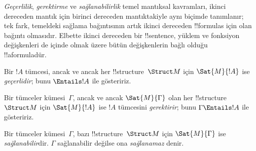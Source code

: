 


\begin{explain}
\emph{Geçerlilik}, \emph{gerektirme} ve \emph{sağlanabilirlik} temel
mantıksal kavramları, ikinci dereceden mantık için birinci dereceden
mantıktakiyle aynı biçimde tanımlanır; tek fark, temeldeki sağlama
bağıntısının artık ikinci dereceden !!{formula}s için olan bağıntı olmasıdır.
Elbette ikinci dereceden bir !!{sentence}, yüklem ve fonksiyon değişkenleri
de içinde olmak üzere bütün değişkenlerin bağlı olduğu !!a{formula}{}dür.
\end{explain}

\begin{defn}[Geçerlilik]
Bir $!A$ tümcesi, ancak ve ancak her !!{structure}~$\Struct M$ için
$\Sat{M}{!A}$ ise \emph{geçerlidir}; bunu $\Entails !A$ ile gösteririz.
\end{defn}

\begin{defn}[Gerektirme]
Bir tümceler kümesi~$\Gamma$, ancak ve ancak $\Sat{M}{\Gamma}$ olan her
!!{structure}~$\Struct M$ için $\Sat{M}{!A}$ ise $!A$ tümcesini
\emph{gerektirir}; bunu $\Gamma \Entails !A$ ile gösteririz.
\end{defn}

\begin{defn}[Sağlanabilirlik]
Bir tümceler kümesi~$\Gamma$, bazı !!{structure}~$\Struct M$ için
$\Sat{M}{\Gamma}$ ise \emph{sağlanabilir}dir. $\Gamma$ sağlanabilir değilse
ona \emph{sağlanamaz} denir.
\end{defn}

